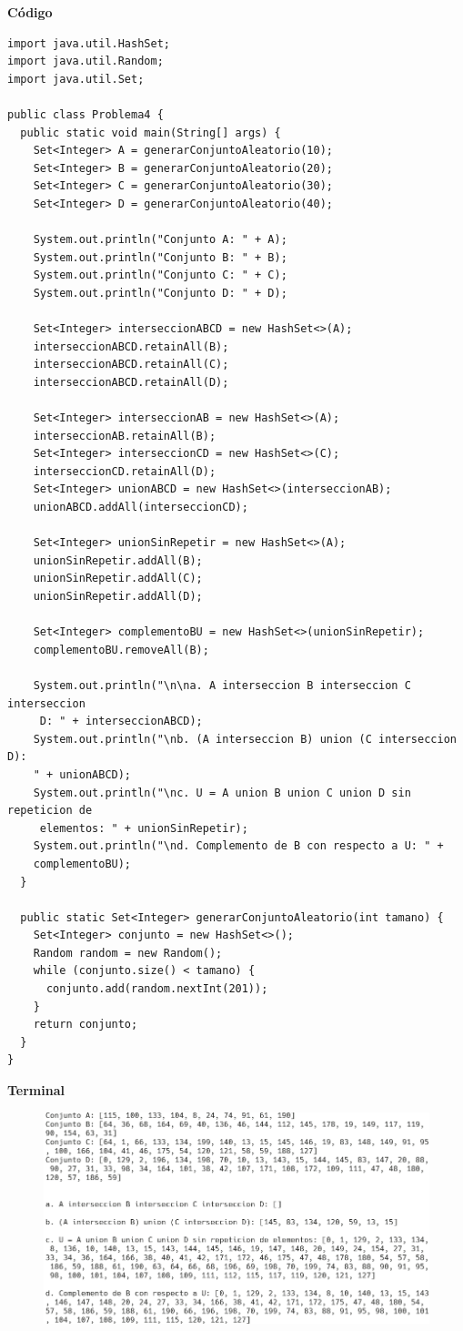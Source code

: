 \documentclass[11pt, twocolumn]{article}
\begin{document}
  \textbf{Código}
  \begin{lstlisting}
import java.util.HashSet;
import java.util.Random;
import java.util.Set;

public class Problema4 {
  public static void main(String[] args) {
    Set<Integer> A = generarConjuntoAleatorio(10);
    Set<Integer> B = generarConjuntoAleatorio(20);
    Set<Integer> C = generarConjuntoAleatorio(30);
    Set<Integer> D = generarConjuntoAleatorio(40);

    System.out.println("Conjunto A: " + A);
    System.out.println("Conjunto B: " + B);
    System.out.println("Conjunto C: " + C);
    System.out.println("Conjunto D: " + D);

    Set<Integer> interseccionABCD = new HashSet<>(A);
    interseccionABCD.retainAll(B);
    interseccionABCD.retainAll(C);
    interseccionABCD.retainAll(D);

    Set<Integer> interseccionAB = new HashSet<>(A);
    interseccionAB.retainAll(B);
    Set<Integer> interseccionCD = new HashSet<>(C);
    interseccionCD.retainAll(D);
    Set<Integer> unionABCD = new HashSet<>(interseccionAB);
    unionABCD.addAll(interseccionCD);

    Set<Integer> unionSinRepetir = new HashSet<>(A);
    unionSinRepetir.addAll(B);
    unionSinRepetir.addAll(C);
    unionSinRepetir.addAll(D);

    Set<Integer> complementoBU = new HashSet<>(unionSinRepetir);
    complementoBU.removeAll(B);
    
    System.out.println("\n\na. A interseccion B interseccion C interseccion
     D: " + interseccionABCD);
    System.out.println("\nb. (A interseccion B) union (C interseccion D): 
    " + unionABCD);
    System.out.println("\nc. U = A union B union C union D sin repeticion de
     elementos: " + unionSinRepetir);
    System.out.println("\nd. Complemento de B con respecto a U: " + 
    complementoBU);
  }
  
  public static Set<Integer> generarConjuntoAleatorio(int tamano) {
    Set<Integer> conjunto = new HashSet<>();
    Random random = new Random();
    while (conjunto.size() < tamano) {
      conjunto.add(random.nextInt(201)); 
    }
    return conjunto;
  }
}    
  \end{lstlisting}

  \textbf{Terminal}
  \begin{figure}[ht]
    \includegraphics[width=\columnwidth, center]{P4.png}
  \end{figure}
\end{document}
